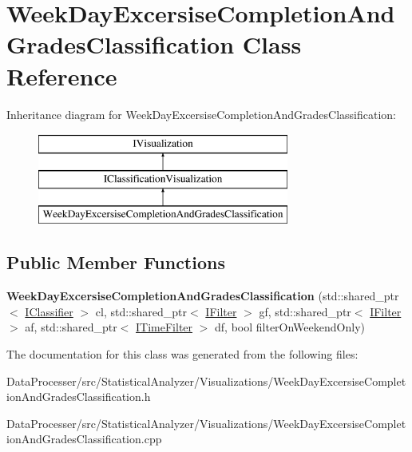 \hypertarget{classWeekDayExcersiseCompletionAndGradesClassification}{}\section{Week\+Day\+Excersise\+Completion\+And\+Grades\+Classification Class Reference}
\label{classWeekDayExcersiseCompletionAndGradesClassification}
Inheritance diagram for Week\+Day\+Excersise\+Completion\+And\+Grades\+Classification\+:\begin{figure}[H]
\begin{center}
\leavevmode
\includegraphics[height=3.000000cm]{classWeekDayExcersiseCompletionAndGradesClassification}
\end{center}
\end{figure}
\subsection*{Public Member Functions}
\begin{DoxyCompactItemize}
\item 
\mbox{\label{classWeekDayExcersiseCompletionAndGradesClassification_acb59668b80bf2a80f0697f91ef4bc729}} 
{\bfseries Week\+Day\+Excersise\+Completion\+And\+Grades\+Classification} (std\+::shared\+\_\+ptr$<$ \hyperlink{classIClassifier}{I\+Classifier} $>$ cl, std\+::shared\+\_\+ptr$<$ \hyperlink{classIFilter}{I\+Filter} $>$ gf, std\+::shared\+\_\+ptr$<$ \hyperlink{classIFilter}{I\+Filter} $>$ af, std\+::shared\+\_\+ptr$<$ \hyperlink{classITimeFilter}{I\+Time\+Filter} $>$ df, bool filter\+On\+Weekend\+Only)
\end{DoxyCompactItemize}


The documentation for this class was generated from the following files\+:\begin{DoxyCompactItemize}
\item 
Data\+Processer/src/\+Statistical\+Analyzer/\+Visualizations/Week\+Day\+Excersise\+Completion\+And\+Grades\+Classification.\+h\item 
Data\+Processer/src/\+Statistical\+Analyzer/\+Visualizations/Week\+Day\+Excersise\+Completion\+And\+Grades\+Classification.\+cpp\end{DoxyCompactItemize}
